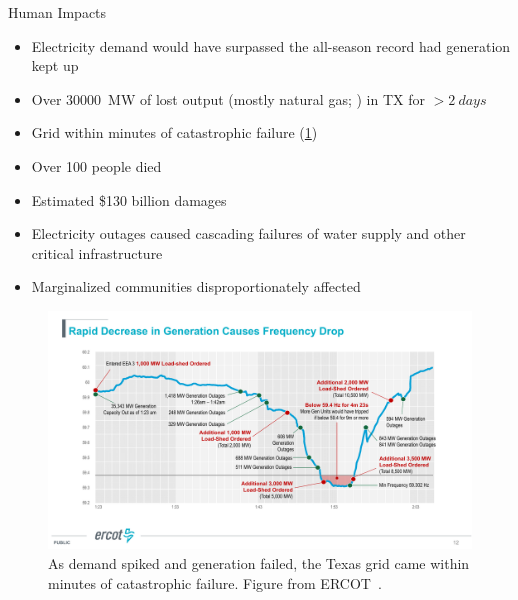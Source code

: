 \begin{block}{Human Impacts}
    \begin{itemize}
        \item Electricity demand would have surpassed the all-season record had generation kept up \cite{ercotpublic_outagesv1:2021}
        \item Over \SI{30000}{\mega\watt} of lost output (mostly natural gas; \cite{busby_cascadingrisks:2021}) in TX for $> \SI{2}{days}$
        \item Grid within minutes of catastrophic failure (\cref{fig:ercot-frequency})
        \item Over 100 people died \cite{mulcahy_urideath:2021}
        \item Estimated \$130 billion damages \cite{busby_cascadingrisks:2021}
        \item Electricity outages caused cascading failures of water supply and other critical infrastructure
        \item Marginalized communities disproportionately affected \cite{dobbins_blackoutdisparity:2021}
    \end{itemize}
    \begin{framed}
        \begin{figure}
            \centering
            \includegraphics[width=\textwidth]{magness_frequency.pdf}
            \caption{
                As demand spiked and generation failed, the Texas grid came within minutes of catastrophic failure.
                Figure from ERCOT~\cite{magness_review:2021}.
            }
            \label{fig:ercot-frequency}
        \end{figure}
    \end{framed}
\end{block}